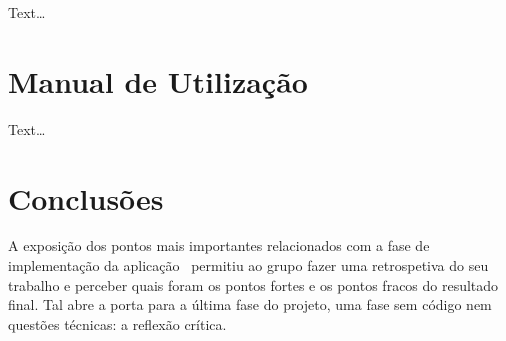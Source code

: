 Text\ldots



\section{Manual de Utilização}
\label{sec::implement:utilizacao}

Text\ldots


\section{Conclusões}
\label{chap3:sec:concs}

A exposição dos pontos mais importantes relacionados com a fase de implementação da aplicação \theapp~permitiu ao grupo fazer uma retrospetiva do seu trabalho e perceber quais foram os pontos fortes e os pontos fracos do resultado final. Tal abre a porta para a última fase do projeto, uma fase sem código nem questões técnicas: a reflexão crítica.
